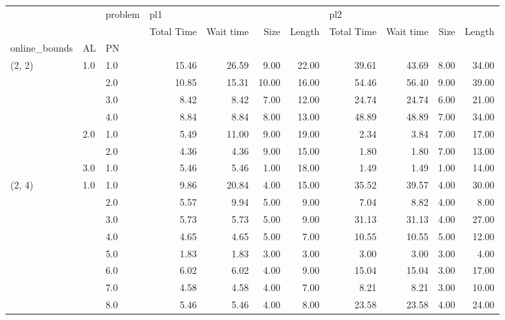 \begin{tabular}{lllrrrrrrrr}
\toprule
       &     & problem & \multicolumn{4}{l}{pl1} & \multicolumn{4}{l}{pl2} \\
       &     & {} & Total Time & Wait time &  Size & Length & Total Time & Wait time & Size & Length \\
online\_bounds & AL & PN &            &           &       &        &            &           &      &        \\
\midrule
(2, 2) & 1.0 & 1.0  &      15.46 &     26.59 &  9.00 &  22.00 &      39.61 &     43.69 & 8.00 &  34.00 \\
       &     & 2.0  &      10.85 &     15.31 & 10.00 &  16.00 &      54.46 &     56.40 & 9.00 &  39.00 \\
       &     & 3.0  &       8.42 &      8.42 &  7.00 &  12.00 &      24.74 &     24.74 & 6.00 &  21.00 \\
       &     & 4.0  &       8.84 &      8.84 &  8.00 &  13.00 &      48.89 &     48.89 & 7.00 &  34.00 \\
       & 2.0 & 1.0  &       5.49 &     11.00 &  9.00 &  19.00 &       2.34 &      3.84 & 7.00 &  17.00 \\
       &     & 2.0  &       4.36 &      4.36 &  9.00 &  15.00 &       1.80 &      1.80 & 7.00 &  13.00 \\
       & 3.0 & 1.0  &       5.46 &      5.46 &  1.00 &  18.00 &       1.49 &      1.49 & 1.00 &  14.00 \\
(2, 4) & 1.0 & 1.0  &       9.86 &     20.84 &  4.00 &  15.00 &      35.52 &     39.57 & 4.00 &  30.00 \\
       &     & 2.0  &       5.57 &      9.94 &  5.00 &   9.00 &       7.04 &      8.82 & 4.00 &   8.00 \\
       &     & 3.0  &       5.73 &      5.73 &  5.00 &   9.00 &      31.13 &     31.13 & 4.00 &  27.00 \\
       &     & 4.0  &       4.65 &      4.65 &  5.00 &   7.00 &      10.55 &     10.55 & 5.00 &  12.00 \\
       &     & 5.0  &       1.83 &      1.83 &  3.00 &   3.00 &       3.00 &      3.00 & 3.00 &   4.00 \\
       &     & 6.0  &       6.02 &      6.02 &  4.00 &   9.00 &      15.04 &     15.04 & 3.00 &  17.00 \\
       &     & 7.0  &       4.58 &      4.58 &  4.00 &   7.00 &       8.21 &      8.21 & 3.00 &  10.00 \\
       &     & 8.0  &       5.46 &      5.46 &  4.00 &   8.00 &      23.58 &     23.58 & 4.00 &  24.00 \\

\end{tabular}
